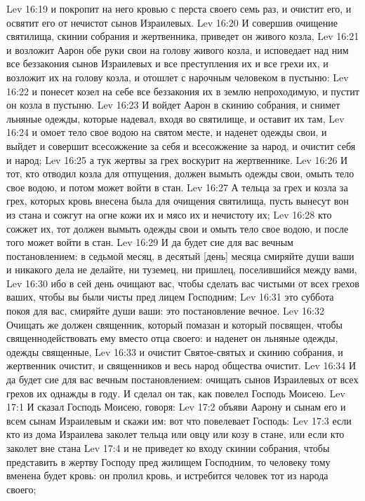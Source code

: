 Lev 16:19  и покропит на него кровью с перста своего семь раз, и очистит его, и освятит его от нечистот сынов Израилевых.
Lev 16:20  И совершив очищение святилища, скинии собрания и жертвенника, приведет он живого козла,
Lev 16:21  и возложит Аарон обе руки свои на голову живого козла, и исповедает над ним все беззакония сынов Израилевых и все преступления их и все грехи их, и возложит их на голову козла, и отошлет с нарочным человеком в пустыню:
Lev 16:22  и понесет козел на себе все беззакония их в землю непроходимую, и пустит он козла в пустыню.
Lev 16:23  И войдет Аарон в скинию собрания, и снимет льняные одежды, которые надевал, входя во святилище, и оставит их там,
Lev 16:24  и омоет тело свое водою на святом месте, и наденет одежды свои, и выйдет и совершит всесожжение за себя и всесожжение за народ, и очистит себя и народ;
Lev 16:25  а тук жертвы за грех воскурит на жертвеннике.
Lev 16:26  И тот, кто отводил козла для отпущения, должен вымыть одежды свои, омыть тело свое водою, и потом может войти в стан.
Lev 16:27  А тельца за грех и козла за грех, которых кровь внесена была для очищения святилища, пусть вынесут вон из стана и сожгут на огне кожи их и мясо их и нечистоту их;
Lev 16:28  кто сожжет их, тот должен вымыть одежды свои и омыть тело свое водою, и после того может войти в стан.
Lev 16:29  И да будет сие для вас вечным постановлением: в седьмой месяц, в десятый [день] месяца смиряйте души ваши и никакого дела не делайте, ни туземец, ни пришлец, поселившийся между вами,
Lev 16:30  ибо в сей день очищают вас, чтобы сделать вас чистыми от всех грехов ваших, чтобы вы были чисты пред лицем Господним;
Lev 16:31  это суббота покоя для вас, смиряйте души ваши: это постановление вечное.
Lev 16:32  Очищать же должен священник, который помазан и который посвящен, чтобы священнодействовать ему вместо отца своего: и наденет он льняные одежды, одежды священные,
Lev 16:33  и очистит Святое-святых и скинию собрания, и жертвенник очистит, и священников и весь народ общества очистит.
Lev 16:34  И да будет сие для вас вечным постановлением: очищать сынов Израилевых от всех грехов их однажды в году. И сделал он так, как повелел Господь Моисею.
Lev 17:1  И сказал Господь Моисею, говоря:
Lev 17:2  объяви Аарону и сынам его и всем сынам Израилевым и скажи им: вот что повелевает Господь:
Lev 17:3  если кто из дома Израилева заколет тельца или овцу или козу в стане, или если кто заколет вне стана
Lev 17:4  и не приведет ко входу скинии собрания, чтобы представить в жертву Господу пред жилищем Господним, то человеку тому вменена будет кровь: он пролил кровь, и истребится человек тот из народа своего;
